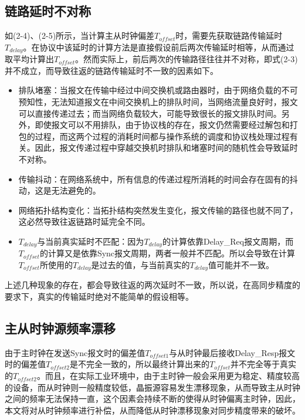 \subsection{链路延时不对称}
\label{sec:1588_problem_1}
如(2-4)、(2-5)所示，当计算主从时钟偏差$T_{offset}$时，需要先获取链路传输延时$T_{delay}$。在协议中该延时的计算方法是直接假设前后两次传输延时相等，从而通过取平均计算出$T_{offset}$。然而实际上，前后两次的传输路径往往并不对称，即式(2-3)并不成立，而导致往返的链路传输延时不一致的因素\supercite{55}如下。
\begin{itemize}[noitemsep,topsep=0pt,parsep=0pt,partopsep=0pt]
	\item 排队堵塞：当报文在传输中经过中间交换机或路由器时，由于网络负载的不可预知性，无法知道报文在中间交换机上的排队时间，当网络流量良好时，报文可以直接传递过去；而当网络负载较大，可能导致很长的报文排队时间。另外，即使报文可以不用排队，由于协议栈的存在，报文仍然需要经过解包和打包的过程，而这两个过程的消耗时间都与操作系统的调度和协议栈处理过程有关。因此，报文传递过程中穿越交换机时排队和堵塞时间的随机性会导致延时不对称\supercite{46}。
	\item 传输抖动：在网络系统中，所有信息的传递过程所消耗的时间会存在固有的抖动，这是无法避免的。
	\item 网络拓扑结构变化：当拓扑结构突然发生变化，报文传输的路径也就不同了，这必然导致往返链路时延完全不同。
	\item $T_{delay}$与当前真实延时不匹配：因为$T_{delay}$的计算依靠Delay\_Req报文周期，而$T_{offset}$的计算又是依靠Sync报文周期，两者一般并不匹配。所以会导致在计算$T_{offset}$所使用的$T_{delay}$是过去的值，与当前真实的$T_{delay}$值可能并不一致。
\end{itemize}

上述几种现象的存在，都会导致往返的两次延时不一致，所以说，在高同步精度的要求下，真实的传输延时绝对不能简单的假设相等。

\subsection{主从时钟源频率漂移}
由于主时钟在发送Sync报文时的偏差值$T_{offset1}$与从时钟最后接收Delay\_Resp报文时的偏差值$T_{offset2}$是不完全一致的，所以最终计算出来的$T_{offset}$并不完全等于真实的$T_{offset2}$。而且，在实际工业环境中，由于主时钟一般会采用更为稳定、精度较高的设备，而从时钟则一般精度较低，晶振源容易发生漂移现象，从而导致主从时钟之间的频率无法保持一直，这个因素会持续不断的使得从时钟偏离主时钟，因此，本文将对从时钟频率进行补偿，从而降低从时钟漂移现象对同步精度带来的破坏。

